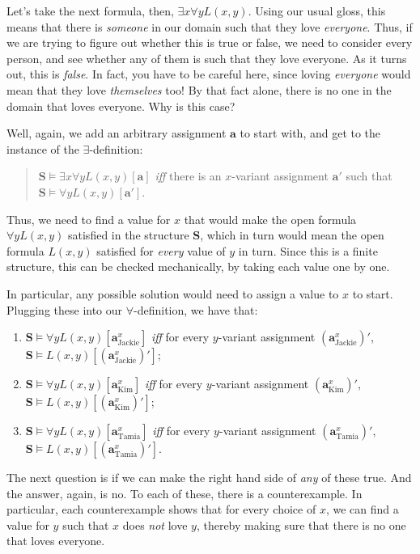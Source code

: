 Let's take the next formula, then, $\exists x \forall y L(x, y)$. Using our usual gloss, this means that there is \textit{someone} in our domain such that they love \textit{everyone}. Thus, if we are trying to figure out whether this is true or false, we need to consider every person, and see whether any of them is such that they love everyone. As it turns out, this is \textit{false}. In fact, you have to be careful here, since loving \textit{everyone} would mean that they love \textit{themselves} too! By that fact alone, there is no one in the domain that loves everyone. Why is this case?

Well, again, we add an arbitrary assignment $\mathbf{a}$ to start with, and get to the instance of the $\exists$-definition:

\begin{quote}
	$\mathbf{S} \models \exists x \forall y L(x,y)[\mathbf{a}]$ \textit{iff} there is an $x$-variant assignment $\mathbf{a}'$ such that $\mathbf{S} \models \forall y L(x,y)[\mathbf{a}']$. 
\end{quote}

Thus, we need to find a value for $x$ that would make the open formula $\forall y L(x, y)$ satisfied in the structure $\mathbf{S}$, which in turn would mean the open formula $L(x, y)$ satisfied for \textit{every} value of $y$ in turn. Since this is a finite structure, this can be checked mechanically, by taking each value one by one. 

In particular, any possible solution would need to assign a value to $x$ to start. Plugging these into our $\forall$-definition, we have that: 

\begin{enumerate}
\item	$\mathbf{S} \models \forall y L(x,y)[\mathbf{a}^x_\text{Jackie}]$ \textit{iff} for every $y$-variant assignment $(\mathbf{a}^x_\text{Jackie})'$, $\mathbf{S} \models L(x,y)[(\mathbf{a}^x_\text{Jackie})']$;
\item $\mathbf{S} \models \forall y L(x,y)[\mathbf{a}^x_\text{Kim}]$ \textit{iff} for every $y$-variant assignment $(\mathbf{a}^x_\text{Kim})'$, $\mathbf{S} \models L(x,y)[(\mathbf{a}^x_\text{Kim})']$;
\item $\mathbf{S} \models \forall y L(x,y)[\mathbf{a}^x_\text{Tamia}]$ \textit{iff} for every $y$-variant assignment $(\mathbf{a}^x_\text{Tamia})'$, $\mathbf{S} \models L(x,y)[(\mathbf{a}^x_\text{Tamia})']$.
\end{enumerate}

The next question is if we can make the right hand side of \textit{any} of these true. And the answer, again, is no. To each of these, there is a counterexample. In particular, each counterexample shows that for every choice of $x$, we can find a value for $y$ such that $x$ does \textit{not} love $y$, thereby making sure that there is no one that loves everyone. 

